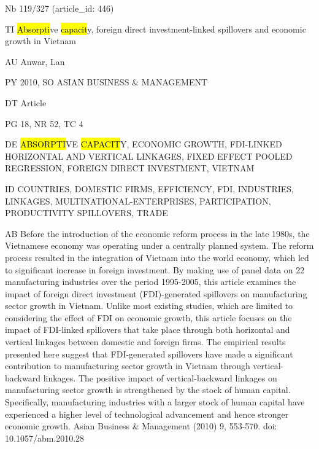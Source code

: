 \documentclass[a4paper]{article}
\begin{document}
\vspace*{-2cm}
Nb \tabto{0cm}119/327 (article\_id: 446)\par
TI \tabto{0cm}\hl{Absorpti}ve \hl{capacit}y, foreign direct investment-linked spillovers and economic growth in Vietnam\par
AU \tabto{0cm}Anwar, Lan\par
PY \tabto{0cm}2010, SO ASIAN BUSINESS \& MANAGEMENT\par
DT \tabto{0cm}Article\par
PG \tabto{0cm}18, NR 52, TC 4\par
DE \tabto{0cm}\hl{ABSORPTI}VE \hl{CAPACIT}Y, ECONOMIC GROWTH, FDI-LINKED HORIZONTAL AND VERTICAL LINKAGES, FIXED EFFECT POOLED REGRESSION, FOREIGN DIRECT INVESTMENT, VIETNAM\par
ID \tabto{0cm}COUNTRIES, DOMESTIC FIRMS, EFFICIENCY, FDI, INDUSTRIES, LINKAGES, MULTINATIONAL-ENTERPRISES, PARTICIPATION, PRODUCTIVITY SPILLOVERS, TRADE\par
AB \tabto{0cm}Before the introduction of the economic reform process in the late 1980s, the Vietnamese economy was operating under a centrally planned system. The reform process resulted in the integration of Vietnam into the world economy, which led to significant increase in foreign investment. By making use of panel data on 22 manufacturing industries over the period 1995-2005, this article examines the impact of foreign direct investment (FDI)-generated spillovers on manufacturing sector growth in Vietnam. Unlike most existing studies, which are limited to considering the effect of FDI on economic growth, this article focuses on the impact of FDI-linked spillovers that take place through both horizontal and vertical linkages between domestic and foreign firms. The empirical results presented here suggest that FDI-generated spillovers have made a significant contribution to manufacturing sector growth in Vietnam through vertical-backward linkages. The positive impact of vertical-backward linkages on manufacturing sector growth is strengthened by the stock of human capital. Specifically, manufacturing industries with a larger stock of human capital have experienced a higher level of technological advancement and hence stronger economic growth. Asian Business \& Management (2010) 9, 553-570. doi: 10.1057/abm.2010.28\par
\clearpage
\end{document}
